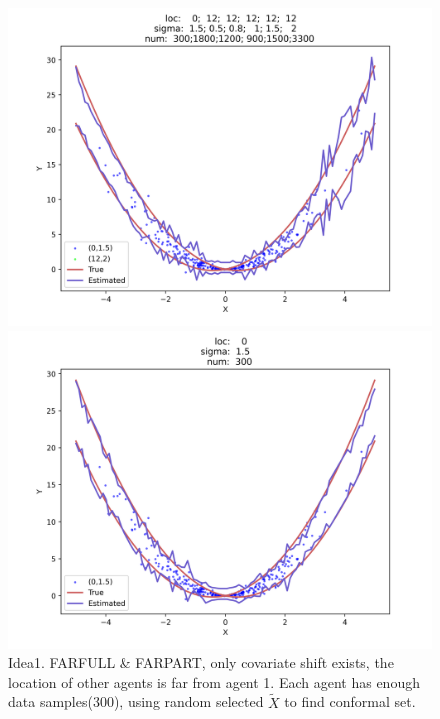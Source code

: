 \documentclass[12pt, a4paper, oneside]{article}
\begin{document}
    \begin{figure}[htbp]
        \centering
        \begin{minipage}{0.495\linewidth}
            \centering
            \includegraphics[width=0.98\linewidth]{fig/Ex1_1/FARFULL.png}
        \end{minipage}
        \begin{minipage}{0.495\linewidth}
            \centering
            \includegraphics[width=0.98\linewidth]{fig/Ex1_1/FARPART.png}
        \end{minipage}
        \caption{Idea1. FARFULL \& FARPART, only covariate shift exists, the location of other agents is far from agent 1. Each agent has enough data samples(300), using random selected $\tilde{X}$ to find conformal set.}
        \label{Fig3}
    \end{figure}
\end{document}
